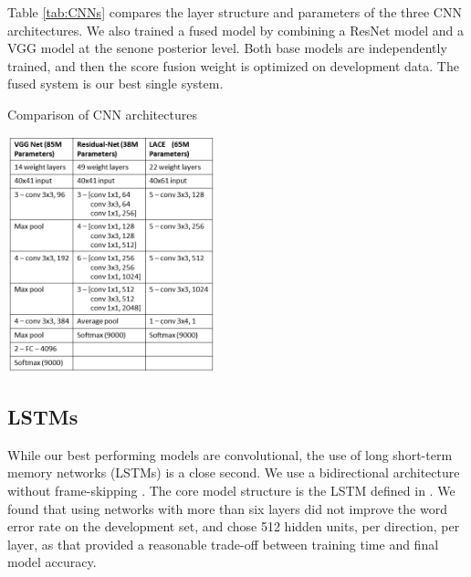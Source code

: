 \documentclass{article}
\begin{document}
Table \ref{tab:CNNs} compares the layer structure and parameters of the three CNN architectures. 
We also trained a fused model by combining a ResNet model and a VGG model at 
the senone posterior level. Both base models are independently trained, and then the score fusion weight is optimized on development data. 
The fused system is our best single system. 
\begin{table}[t]
\centering
\caption{Comparison of CNN architectures}
\vspace*{0.1in}
\label{tab:CNNs}
\includegraphics[width=0.45\textwidth]{CNNs-cropped.png}
\end{table}
\subsection{LSTMs}
While our best performing models are convolutional, the
use of long short-term memory networks (LSTMs) is a close second. We use a 
bidirectional architecture \cite{graves2005framewise} without frame-skipping
\cite{sak2015fast}. The core model structure is the LSTM defined in 
\cite{sak2014long}. We found that using networks with more than six
layers did not improve the word error rate on the development set,
and chose 512 hidden units, per direction, per layer, as that provided a 
reasonable trade-off between training time and final model accuracy.
\end{document}
